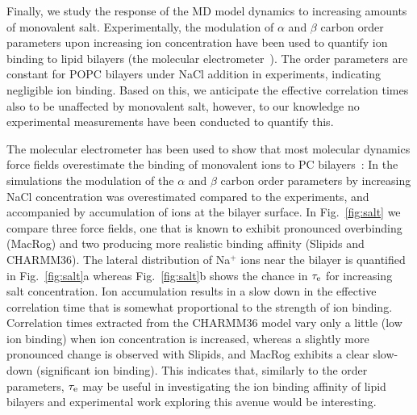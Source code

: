 \documentclass[journal=jpcbfk,manuscript=article,layout=twocolumn]{achemso}
\begin{document}
Finally, we study the response of the MD model dynamics to increasing amounts of monovalent salt. Experimentally, the modulation of $\alpha$ and $\beta$ carbon order parameters upon increasing ion concentration have been used to quantify ion binding to lipid bilayers (the molecular electrometer~\cite{seeling87,catte16}). The order parameters are constant for POPC bilayers under NaCl addition in experiments, indicating negligible ion binding. Based on this, we anticipate the effective correlation times also to be unaffected by monovalent salt, however, to our knowledge no experimental measurements have been conducted to quantify this.

The molecular electrometer has been used to show that most molecular dynamics force fields overestimate the binding of monovalent ions to PC bilayers~\cite{catte16}: In the simulations the modulation of the $\alpha$ and $\beta$ carbon order parameters by increasing NaCl concentration was overestimated compared to the experiments, and accompanied by accumulation of ions at the bilayer surface. In Fig.~\ref{fig:salt} we compare three force fields, one that is known to exhibit pronounced overbinding~\cite{catte16} (MacRog) and two producing more realistic binding affinity (Slipids and CHARMM36). The lateral distribution of Na$^{+}$ ions near the bilayer is quantified in Fig.~\ref{fig:salt}a whereas Fig.~\ref{fig:salt}b shows the chance in $\tau_{\rm{e}}$ for increasing salt concentration. Ion accumulation results in a slow down in the effective correlation time that is somewhat proportional to the strength of ion binding. Correlation times extracted from the CHARMM36 model vary only a little (low ion binding) when ion concentration is increased, whereas a slightly more pronounced change is observed with Slipids, and MacRog exhibits a clear slow-down (significant ion binding). This indicates that, similarly to the order parameters, $\tau_{\rm{e}}$ may be useful in investigating the ion binding affinity of lipid bilayers and experimental work exploring this avenue would be interesting.   

\end{document}
